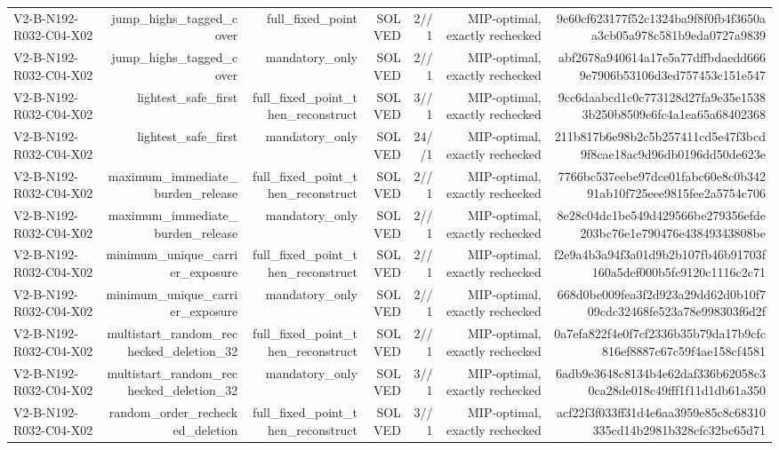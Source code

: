 {\begin{longtable}{lrrrrrr}
V2-B-N192-R032-C04-X02 & jump\_highs\_tagged\_cover & full\_fixed\_point & SOLVED & 2//1 & MIP-optimal, exactly rechecked & 9e60cf623177f52c1324ba9f8f0fb4f3650aa3cb05a978c581b9eda0727a9839 \\
V2-B-N192-R032-C04-X02 & jump\_highs\_tagged\_cover & mandatory\_only & SOLVED & 2//1 & MIP-optimal, exactly rechecked & abf2678a940614a17e5a77dffbdaedd6669e7906b53106d3ed757453c151e547 \\
V2-B-N192-R032-C04-X02 & lightest\_safe\_first & full\_fixed\_point\_then\_reconstruct & SOLVED & 3//1 & MIP-optimal, exactly rechecked & 9cc6daabcd1c0c773128d27fa9e35e15383b250b8509e6fc4a1ea65a68402368 \\
V2-B-N192-R032-C04-X02 & lightest\_safe\_first & mandatory\_only & SOLVED & 24//1 & MIP-optimal, exactly rechecked & 211b817b6e98b2c5b257411cd5e47f3bcd9f8cae18ac9d96db0196dd50de623e \\
V2-B-N192-R032-C04-X02 & maximum\_immediate\_burden\_release & full\_fixed\_point\_then\_reconstruct & SOLVED & 2//1 & MIP-optimal, exactly rechecked & 7766bc537eebe97dce01fabc60e8c0b34291ab10f725eee9815fee2a5754c706 \\
V2-B-N192-R032-C04-X02 & maximum\_immediate\_burden\_release & mandatory\_only & SOLVED & 2//1 & MIP-optimal, exactly rechecked & 8e28c04dc1be549d429566be279356efde203bc76e1e790476e43849343808be \\
V2-B-N192-R032-C04-X02 & minimum\_unique\_carrier\_exposure & full\_fixed\_point\_then\_reconstruct & SOLVED & 2//1 & MIP-optimal, exactly rechecked & f2e9a4b3a94f3a01d9b2b107fb46b91703f160a5def000b5fc9120c1116c2c71 \\
V2-B-N192-R032-C04-X02 & minimum\_unique\_carrier\_exposure & mandatory\_only & SOLVED & 2//1 & MIP-optimal, exactly rechecked & 668d0be009fea3f2d923a29dd62d0b10f709cdc32468fe523a78e998303f6d2f \\
V2-B-N192-R032-C04-X02 & multistart\_random\_rechecked\_deletion\_32 & full\_fixed\_point\_then\_reconstruct & SOLVED & 2//1 & MIP-optimal, exactly rechecked & 0a7efa822f4e0f7cf2336b35b79da17b9cfc816ef8887c67c59f4ae158cf4581 \\
V2-B-N192-R032-C04-X02 & multistart\_random\_rechecked\_deletion\_32 & mandatory\_only & SOLVED & 3//1 & MIP-optimal, exactly rechecked & 6adb9e3648c8134b4e62daf336b62058c30ca28de018c49fff1f11d1db61a350 \\
V2-B-N192-R032-C04-X02 & random\_order\_rechecked\_deletion & full\_fixed\_point\_then\_reconstruct & SOLVED & 3//1 & MIP-optimal, exactly rechecked & acf22f3f033ff31d4e6aa3959e85c8c68310335cd14b2981b328cfc32bc65d71 \\

\end{longtable}}
